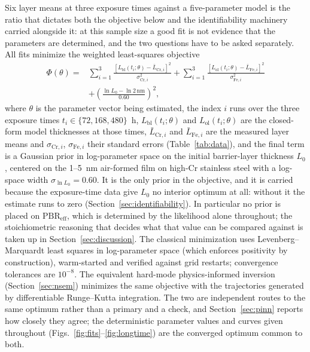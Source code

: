 \documentclass[pdflatex,sn-nature]{sn-jnl}
\begin{document}
Six layer means at three exposure times against a five-parameter model
is the ratio that dictates both the objective below and the
identifiability machinery carried alongside it: at this sample size a
good fit is not evidence that the parameters are determined, and the
two questions have to be asked separately. All fits minimize the
weighted least-squares objective
\begin{equation}
\begin{split}
\Phi(\theta) = {}&
\sum_{i=1}^{3} \frac{\left[L_\text{bl}(t_i;\theta) - \bar{L}_{\text{Cr},i}\right]^2}{\sigma_{\text{Cr},i}^2}
+ \sum_{i=1}^{3} \frac{\left[L_\text{ol}(t_i;\theta) - \bar{L}_{\text{Fe},i}\right]^2}{\sigma_{\text{Fe},i}^2} \\
&+ \left(\frac{\ln L_0 - \ln 2\,\text{nm}}{0.60}\right)^{\!2},
\end{split}
\label{eq:objective}
\end{equation}
where $\theta$ is the parameter vector being estimated, the index $i$
runs over the three exposure times $t_i \in \{72, 168, 480\}$~h,
$L_\text{bl}(t_i;\theta)$ and $L_\text{ol}(t_i;\theta)$ are the
closed-form model thicknesses at those times,
$\bar{L}_{\text{Cr},i}$ and $\bar{L}_{\text{Fe},i}$ are the measured
layer means and $\sigma_{\text{Cr},i}$, $\sigma_{\text{Fe},i}$ their
standard errors (Table~\ref{tab:data}), and the final term is a
Gaussian prior in log-parameter space on the initial barrier-layer
thickness $L_0$, centered on the 1--5~nm air-formed film on high-Cr
stainless steel with a log-space width $\sigma_{\ln L_0} = 0.60$. It is the only
prior in the objective, and it is carried because the exposure-time data
give $L_0$ no interior optimum at all: without it the estimate runs to
zero (Section~\ref{sec:identifiability}). In particular no prior is placed on
$\mathrm{PBR}_\text{eff}$, which is determined by the likelihood alone
throughout; the stoichiometric reasoning that decides what that value
can be compared against is taken up in Section~\ref{sec:discussion}.
The classical minimization
uses Levenberg--Marquardt least squares in log-parameter space (which
enforces positivity by construction), warm-started and verified against
grid restarts; convergence tolerances are $10^{-8}$. The equivalent
hard-mode physics-informed inversion (Section~\ref{sec:nsem}) minimizes
the same objective with the trajectories generated by differentiable
Runge--Kutta integration. The two are independent routes to the same
optimum rather than a primary and a check, and Section~\ref{sec:pinn}
reports how closely they agree; the deterministic parameter values and
curves given throughout
(Figs.~\ref{fig:fits}--\ref{fig:longtime}) are the converged optimum
common to both.
\end{document}
